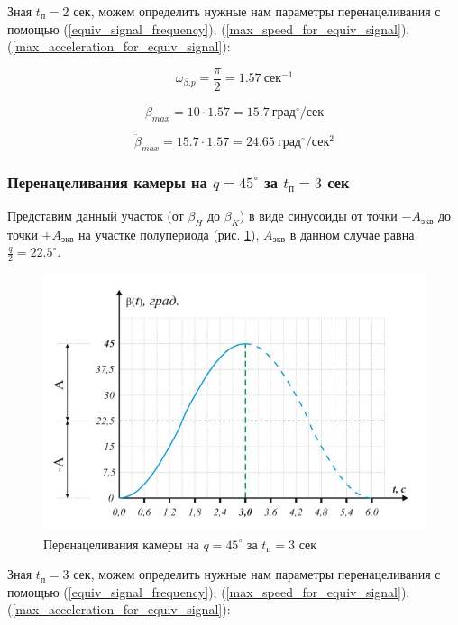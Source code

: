 Зная $t_{\text{п} } = 2$ сек, можем определить нужные нам параметры перенацеливания с помощью (\ref{equiv_signal_frequency}), (\ref{max_speed_for_equiv_signal}), (\ref{max_acceleration_for_equiv_signal}):

$$ \omega_{\beta.p} = \frac{\pi}{2} = 1.57 ~\text{сек}^{-1}                            $$

$$ \dot{\beta}_{max} = 10 \cdot 1.57 = 15.7 ~\text{град}^{\circ} / \text{сек}           $$

$$ \ddot{\beta}_{max} = 15.7 \cdot 1.57 = 24.65 ~\text{град}^{\circ} / \text{сек}^{2}   $$


\subsubsection{Перенацеливания камеры на $q = 45^{\circ}$ за $t_\text{п} = 3$ сек}

Представим данный участок (от $\beta_{H}$ до $\beta_{K}$) в виде синусоиды от точки $-A_\text{экв}$ до точки $+A_\text{экв}$ на участке полупериода (рис. \ref{retarget_45grad_3sec}), $A_\text{экв}$ в данном случае равна $\frac{q}{2} = 22.5^{\circ}$.

\begin{figure}[h!]
    \centering
    \includegraphics[keepaspectratio]{./src/pictures/retarget_equivalent_input_signals/45grad_3sec}
    \caption{Перенацеливания камеры на $q = 45^{\circ}$ за $t_\text{п} = 3$ сек}
    \label{retarget_45grad_3sec}
\end{figure}

Зная $t_{\text{п} } = 3$ сек, можем определить нужные нам параметры перенацеливания с помощью (\ref{equiv_signal_frequency}), (\ref{max_speed_for_equiv_signal}), (\ref{max_acceleration_for_equiv_signal}):

